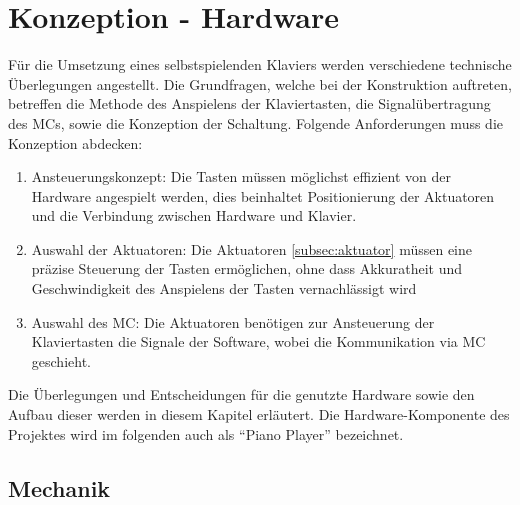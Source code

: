 
\graphicspath{ {./img/} }

\chapter{Konzeption - Hardware}\label{konzeptionHW}
Für die Umsetzung eines selbstspielenden Klaviers werden verschiedene technische Überlegungen angestellt.
Die Grundfragen, welche bei der Konstruktion auftreten, betreffen die Methode des Anspielens der Klaviertasten, die
Signalübertragung des \ac{MC}s, sowie die Konzeption der Schaltung.
Folgende Anforderungen muss die Konzeption abdecken:
\begin{enumerate}
	\item Ansteuerungskonzept: Die Tasten müssen möglichst effizient von der Hardware angespielt werden, dies beinhaltet Positionierung der Aktuatoren und die Verbindung zwischen Hardware und Klavier.
	\item Auswahl der Aktuatoren: Die Aktuatoren \ref{subsec:aktuator} müssen eine präzise Steuerung der Tasten ermöglichen, ohne dass Akkuratheit und Geschwindigkeit des Anspielens der Tasten vernachlässigt wird
	\item Auswahl des \ac{MC}: Die Aktuatoren benötigen zur Ansteuerung der Klaviertasten die Signale der Software, wobei die Kommunikation via \ac{MC} geschieht.
\end{enumerate}
Die Überlegungen und Entscheidungen für die genutzte Hardware sowie den Aufbau dieser werden in diesem Kapitel erläutert.
Die Hardware-Komponente des Projektes wird im folgenden auch als \enquote{Piano Player} bezeichnet.

\section{Mechanik}\label{konzeptionHW-mechanik}

